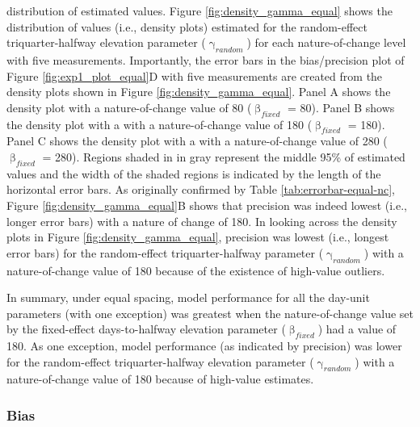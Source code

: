 \documentclass[
12pt, %
twoside,
english]{guelphthesis}
\begin{document}
\noindent distribution of estimated values. Figure \ref{fig:density_gamma_equal} shows the distribution of values (i.e., density plots) estimated for the random-effect triquarter-halfway elevation parameter (\(\upgamma_{random}\)) for each nature-of-change level with five measurements. Importantly, the error bars in the bias/precision plot of Figure \ref{fig:exp1_plot_equal}D with five measurements are created from the density plots shown in Figure \ref{fig:density_gamma_equal}. Panel A shows the density plot with a nature-of-change value of 80 (\(\upbeta_{fixed}\) = 80). Panel B shows the density plot with a with a nature-of-change value of 180 (\(\upbeta_{fixed}\) = 180). Panel C shows the density plot with a with a nature-of-change value of 280 (\(\upbeta_{fixed}\) = 280). Regions shaded in in gray represent the middle 95\% of estimated values and the width of the shaded regions is indicated by the length of the horizontal error bars. As originally confirmed by Table \ref{tab:errorbar-equal-nc}, Figure \ref{fig:density_gamma_equal}B shows that precision was indeed lowest (i.e., longer error bars) with a nature of change of 180. In looking across the density plots in Figure \ref{fig:density_gamma_equal}, precision was lowest (i.e., longest error bars) for the random-effect triquarter-halfway parameter (\(\upgamma_{random}\)) with a nature-of-change value of 180 because of the existence of high-value outliers.

In summary, under equal spacing, model performance for all the day-unit parameters (with one exception) was greatest when the nature-of-change value set by the fixed-effect days-to-halfway elevation parameter (\(\upbeta_{fixed}\)) had a value of 180. As one exception, model performance (as indicated by precision) was lower for the random-effect triquarter-halfway elevation parameter (\(\upgamma_{random}\)) with a nature-of-change value of 180 because of high-value estimates.

\hypertarget{bias-equal-exp1}{%
\subsubsection{Bias}\label{bias-equal-exp1}}
\end{document}
